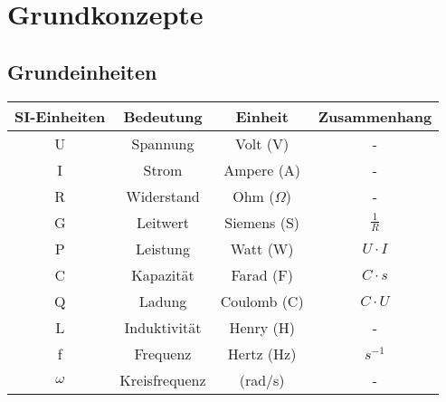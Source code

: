 \chapter{Grundkonzepte}

\section{Grundeinheiten}

\setlength{\tabcolsep}{4pt} %
\renewcommand{\arraystretch}{1.5} %
\begin{table}[!htb]
    \centering
    \begin{tabular}{|c|c|c|c|}
        \hline
        \textbf{SI-Einheiten}   & \textbf{Bedeutung}        & \textbf{Einheit}                  & \textbf{Zusammenhang}              \\ \hline
        U                       & Spannung                  & Volt (V)                          & -                                  \\
        I                       & Strom                     & Ampere (A)                        & -                                  \\
        R                       & Widerstand                & Ohm ($\Omega$)                    & -                                  \\
        G                       & Leitwert                  & Siemens (S)                       & $\frac{1}{R}$                      \\
        P                       & Leistung                  & Watt (W)                          & $U\cdot I$                         \\
        C                       & Kapazität                 & Farad (F)                         & $C\cdot s$                         \\
        Q                       & Ladung                    & Coulomb (C)                       & $C \cdot U$                        \\
        L                       & Induktivität              & Henry (H)                         & -                                  \\
        f                       & Frequenz                  & Hertz (Hz)                        & $s^{-1}$                           \\ 
        $\omega$                & Kreisfrequenz             & (rad/s)                           & -                                  \\

\end{tabular}
\end{table}

